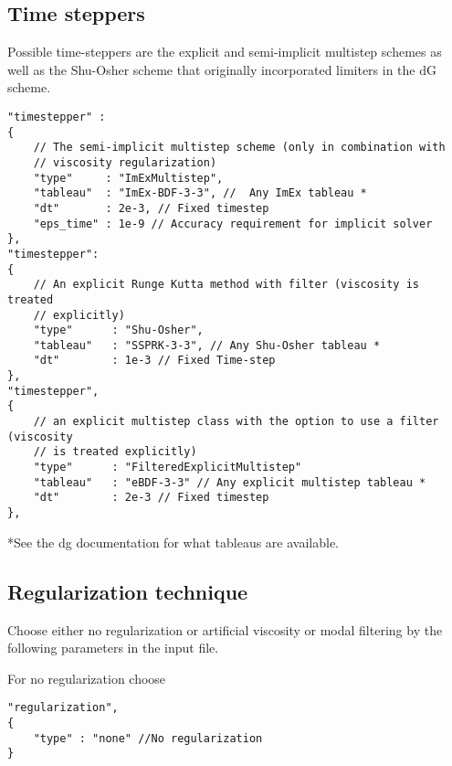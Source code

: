 \subsection{Time steppers}
Possible time-steppers are the explicit and semi-implicit multistep schemes
as well as the Shu-Osher scheme that originally incorporated limiters in the dG scheme.
\begin{verbatim}
"timestepper" :
{
    // The semi-implicit multistep scheme (only in combination with
    // viscosity regularization)
    "type"     : "ImExMultistep",
    "tableau"  : "ImEx-BDF-3-3", //  Any ImEx tableau *
    "dt"       : 2e-3, // Fixed timestep
    "eps_time" : 1e-9 // Accuracy requirement for implicit solver
},
"timestepper":
{
    // An explicit Runge Kutta method with filter (viscosity is treated
    // explicitly)
    "type"      : "Shu-Osher",
    "tableau"   : "SSPRK-3-3", // Any Shu-Osher tableau *
    "dt"        : 1e-3 // Fixed Time-step
},
"timestepper",
{
    // an explicit multistep class with the option to use a filter (viscosity
    // is treated explicitly)
    "type"      : "FilteredExplicitMultistep"
    "tableau"   : "eBDF-3-3" // Any explicit multistep tableau *
    "dt"        : 2e-3 // Fixed timestep
},
\end{verbatim}
*See the dg documentation for what tableaus are available.
\subsection{Regularization technique}
Choose either no regularization or artificial viscosity or modal filtering by the following
parameters in the input file.

For no regularization choose
\begin{verbatim}
"regularization",
{
    "type" : "none" //No regularization
}
\end{verbatim}

